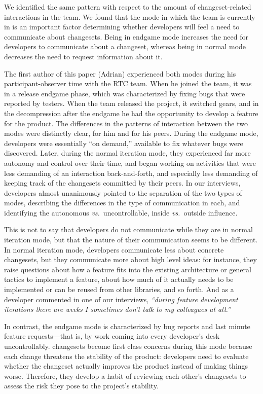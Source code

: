 \documentclass{sig-alternate}
\begin{document}
We identified the same pattern with respect to the amount of changeset-related interactions in the team. We found that the mode in which the team is currently in is an important factor determining whether developers will feel a need to communicate about changesets. Being in endgame mode increases the need for developers to communicate about a changeset, whereas being in normal mode decreases the need to request information about it.

The first author of this paper (Adrian) experienced both modes during his participant-observer time with the RTC team. When he joined the team, it was in a release endgame phase, which was characterized by fixing bugs that were reported by testers. When the team released the project, it switched gears, and in the decompression after the endgame he had the opportunity to develop a feature for the product. The differences in the patterns of interaction between the two modes were distinctly clear, for him and for his peers. During the endgame mode, developers were essentially ``on demand,'' available to fix whatever bugs were discovered. Later, during the normal iteration mode, they experienced far more autonomy and control over their time, and began working on activities that were less demanding of an interaction back-and-forth, and especially less demanding of keeping track of the changesets committed by their peers. In our interviews, developers almost unanimously pointed to the separation of the two types of modes, describing the differences in the type of communication in each, and identifying the autonomous \emph{vs.}~uncontrollable, inside \emph{vs.}~outside influence.

This is not to say that developers do not communicate while they are in normal iteration  mode, but that the nature of their communication seems to be different. In normal iteration mode, developers communicate less about concrete changesets, but they communicate more about high level ideas: for instance, they raise questions about how a feature fits into the existing architecture or general tactics to implement a feature, about how much of it actually needs to be implemented or can be reused from other libraries, and so forth. And as a developer commented in one of our interviews, \emph{``during feature development iterations there are weeks I sometimes don't talk to my colleagues at all.''} 

In contrast, the endgame mode is characterized by bug reports and last minute feature requests---that is, by work coming into every developer's desk uncontrollably. changesets become first class concerns during this mode because each change threatens the stability of the product: developers need to evaluate whether the changeset actually improves the product instead of making things worse. Therefore, they develop a habit of reviewing each other's changesets to assess the risk they pose to the project's stability.
\end{document}
